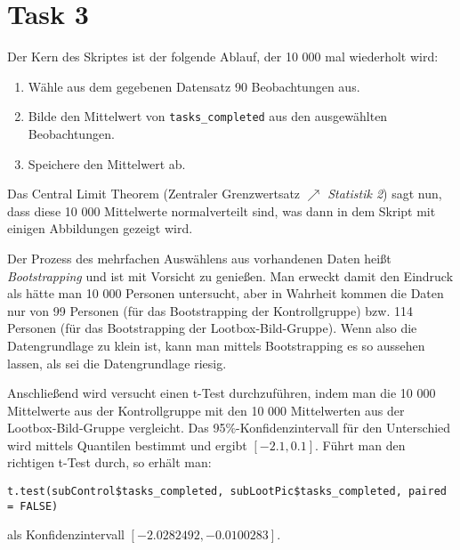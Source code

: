 \documentclass{article}
\begin{document}
	\section*{Task 3}
	Der Kern des Skriptes ist der folgende Ablauf, der 10 000 mal wiederholt wird:
	\begin{enumerate}
		\item Wähle aus dem gegebenen Datensatz 90 Beobachtungen aus.
		\item Bilde den Mittelwert von \texttt{tasks\_completed} aus den ausgewählten Beobachtungen.
		\item Speichere den Mittelwert ab.
	\end{enumerate}
	Das Central Limit Theorem (Zentraler Grenzwertsatz $\nearrow$ \textit{Statistik 2}) sagt nun, dass diese 10 000 Mittelwerte normalverteilt sind, was dann in dem Skript mit einigen Abbildungen gezeigt wird.
	
	Der Prozess des mehrfachen Auswählens aus vorhandenen Daten heißt \textit{Bootstrapping} und ist mit Vorsicht zu genießen. Man erweckt damit den Eindruck als hätte man 10 000 Personen untersucht, aber in Wahrheit kommen die Daten nur von 99 Personen (für das Bootstrapping der Kontrollgruppe) bzw. 114 Personen (für das Bootstrapping der Lootbox-Bild-Gruppe). Wenn also die Datengrundlage zu klein ist, kann man mittels Bootstrapping es so aussehen lassen, als sei die Datengrundlage riesig.
	
	Anschließend wird versucht einen t-Test durchzuführen, indem man die 10 000 Mittelwerte aus der Kontrollgruppe mit den 10 000 Mittelwerten aus der Lootbox-Bild-Gruppe vergleicht. Das 95\%-Konfidenzintervall für den Unterschied wird mittels Quantilen bestimmt und ergibt $[-2.1,0.1]$. Führt man den richtigen t-Test durch, so erhält man:
	\begin{lstlisting}
t.test(subControl$tasks_completed, subLootPic$tasks_completed, paired = FALSE)
	\end{lstlisting}
	als Konfidenzintervall $[-2.0282492,-0.0100283]$.
	
\end{document}
